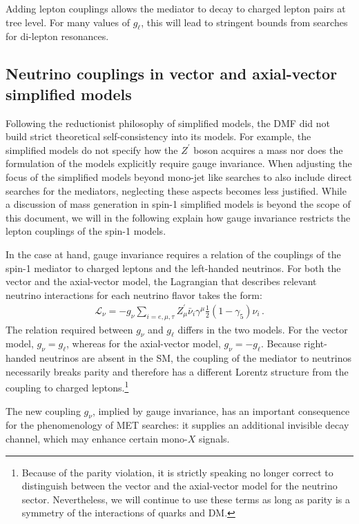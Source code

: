 \documentclass[a4paper, 11pt,notoc]{article}
\begin{document}
Adding lepton couplings allows the mediator to decay to charged lepton pairs at tree level. For many values of $g_\ell$, this will lead to stringent bounds from searches for di-lepton resonances.

\subsection{Neutrino couplings in vector and axial-vector simplified models}

Following the reductionist philosophy of simplified models, the DMF did not build strict theoretical self-consistency into its models. For example, the simplified models do not specify how the $Z^\prime$ boson acquires a mass nor does the formulation of the models explicitly require gauge invariance. When adjusting the focus of the simplified models beyond mono-jet like searches to also include direct searches for the mediators, neglecting these aspects becomes less justified. While a discussion of mass generation in spin-1 simplified models is beyond the scope of this document, we will in the following explain how gauge invariance restricts the lepton couplings of the spin-1 models.

In the case at hand, gauge invariance requires a relation of the couplings of the spin-1 mediator to charged leptons and the  left-handed neutrinos. For both the vector and the axial-vector model, the Lagrangian that describes relevant neutrino interactions for each neutrino flavor takes the form:
\begin{align}
\label{eq:neu}
\mathcal{L}_\nu = - g_\nu \sum_{i=e,\mu,\tau} Z^\prime_\mu \bar \nu_i \gamma^\mu \frac{1}{2}(1-\gamma_5) \nu_i \, .
\end{align}
The relation required between $g_\nu$ and $g_\ell$ differs in the two models. For the vector model, $g_\nu = g_\ell$, whereas for the axial-vector model, $g_\nu = - g_\ell$. Because right-handed neutrinos are absent in the SM, the coupling of the mediator to neutrinos necessarily breaks parity and therefore has a different Lorentz structure from the coupling to charged leptons.\footnote{Because of the parity violation, it is strictly speaking no longer correct to distinguish between the vector and the axial-vector model for the neutrino sector. Nevertheless, we will continue to use these terms as long as parity is a symmetry of the interactions of quarks and DM.}

The new coupling $g_\nu$, implied by gauge invariance, has an important consequence for the phenomenology of MET searches: it supplies an additional invisible decay channel, which may enhance certain mono-$X$ signals. 
\end{document}
